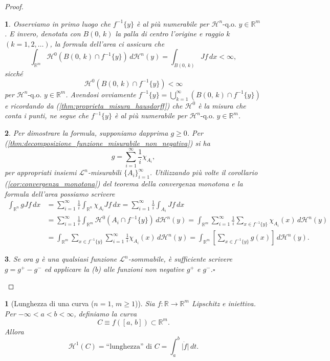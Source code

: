 \documentclass[a4paper,10pt,openright,oneside]{book}
\theoremstyle{theoremstyle}
\theoremstyle{theoremstylewoheader}
\newtheorem{teorema2}[teorema]{}
\theoremstyle{theoremstyle}
\theoremstyle{proofsecstyle}
\newtheorem{proofsec}{}
\theoremstyle{nonumberplain}
\newtheorem{proof}{Dim.}
\newcommand{\RR}{\ensuremath{\mathbb{R}}}
\newcommand{\Leb}{\ensuremath{\mathcal{L}}}
\newcommand{\Haus}{\ensuremath{\mathcal{H}}}
\newcommand{\abs}[1]{\ensuremath{\lvert #1 \rvert}}
\newcommand{\qogni}[2]{\ensuremath{#2\text{-q.o. $\!#1$}}}
\renewcommand{\qedsymbol}{\ensuremath{\square}}
\newcommand{\qed}{\unskip\nobreak\hfill\nobreak\hspace{.5em}\qedsymbol}
\begin{document}
\begin{proof}
\begin{proofsec}
Osserviamo in primo luogo che $f^{-1}\{y\}$ è al più numerabile per $\qogni{y \in \RR^m}{\Haus^n}$. E invero, denotata con $B(0,\, k)$ la palla di centro l'origine e raggio $k$ $(k = 1, 2, \ldots)$, la formula dell'area ci assicura che
\[
\int_{\RR^m} \Haus^0(B(0,\, k) \cap f^{-1}\{y\})\, d\Haus^n(y) = \int_{B(0,\, k)} Jf\, dx < \infty,
\] 
sicché
\[
\Haus^0(B(0,\, k) \cap f^{-1}\{y\}) < \infty
\]
per $\qogni{y \in \RR^m}{\Haus^n}$. Avendosi ovviamente $f^{-1}\{y\} = \bigcup_{k=1}^\infty (B(0,\, k) \cap f^{-1}\{y\})$ e ricordando da (\ref{thm:proprieta_misura_hausdorff}) che $\Haus^0$ è la misura che conta i punti, ne segue che $f^{-1}\{y\}$ è al più numerabile per $\qogni{y \in \RR^m}{\Haus^n}$.
\end{proofsec}

\begin{proofsec}
Per dimostrare la formula, supponiamo dapprima $g \ge 0$. Per (\ref{thm:decomposizione_funzione_misurabile_non_negativa}) si ha
\[
g = \sum_{i=1}^\infty \frac{1}{i} \chi_{A_i},
\]
per appropriati insiemi $\Leb^n$-misurabili $\{A_i\}_{i=1}^\infty$. Utilizzando più volte il corollario (\ref{cor:convergenza_monotona}) del teorema della convergenza monotona e la formula dell'area possiamo scrivere 
\begin{align*}
\int_{\RR^n} gJf\, dx &= \sum_{i=1}^\infty \frac{1}{i} \int_{\RR^n} \chi_{A_i} Jf\, dx = \sum_{i=1}^\infty \frac{1}{i} \int_{A_i} Jf\, dx\\
&= \sum_{i=1}^\infty \frac{1}{i} \int_{\RR^m} \Haus^0(A_i \cap f^{-1}\{y\})\, d\Haus^n(y) = \int_{\RR^m} \sum_{i=1}^\infty \frac{1}{i} \sum_{x \in f^{-1}\{y\}} \chi_{A_i}(x)\, d\Haus^n(y)\\
&= \int_{\RR^m} \sum_{x \in f^{-1}\{y\}} \sum_{i=1}^\infty \frac{1}{i} \chi_{A_i}(x)\, d\Haus^n(y) = \int_{\RR^m} \left[\sum_{x \in f^{-1}\{y\}} g(x)\right]\, d\Haus^n(y).
\end{align*}
\end{proofsec}

\begin{proofsec}
Se ora $g$ è una qualsiasi funzione $\Leb^n$-sommabile, è sufficiente scrivere $g = g^+ - g^-$ ed applicare la (b) alle funzioni non negative $g^+$ e $g^-$.\qed
\end{proofsec}
\end{proof}

\begin{teorema2}[Lunghezza di una curva ($n = 1$, $m \ge 1$)]
Sia $f : \RR \rightarrow \RR^m$ Lipschitz e iniettiva. Per $-\infty < a < b < \infty$, definiamo la \emph{curva}
\[
C \equiv f([a,\, b]) \subset \RR^m.
\]
Allora
\[
\Haus^1(C) = \text{``lunghezza'' di $C$} = \int_a^b \abs{\dot{f}}\, dt.
\]
\end{teorema2}
\end{document}
